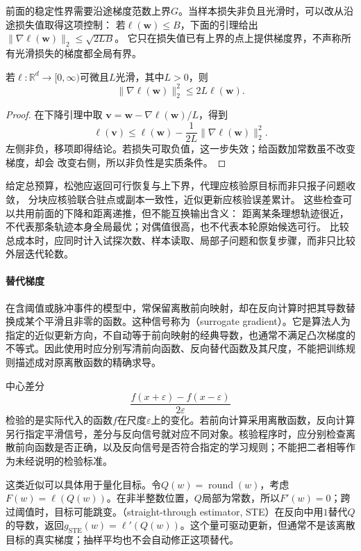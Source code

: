 前面的稳定性界需要沿途梯度范数上界$G$。当样本损失非负且光滑时，可以改从沿途损失值取得这项控制：
若$\ell(\bm w)\leq B$，下面的引理给出$\|\nabla\ell(\bm w)\|_2\leq\sqrt{2LB}$。
它只在损失值已有上界的点上提供梯度界，不声称所有光滑损失的梯度都全局有界。

\begin{lemma}[非负光滑函数的梯度自界]
\label{lem:opt-self-bounding}
若$\ell:\mathbb{R}^d\to[0,\infty)$可微且$L$光滑，其中$L>0$，则
\[
  \lVert\nabla\ell(\bm{w})\rVert_2^2\leq2L\ell(\bm{w}).
\]
\end{lemma}

\begin{proof}
在下降引理中取
$\bm{v}=\bm{w}-\nabla\ell(\bm{w})/L$，得到
\[
  \ell(\bm{v})
  \leq\ell(\bm{w})-\frac{1}{2L}
  \lVert\nabla\ell(\bm{w})\rVert_2^2.
\]
左侧非负，移项即得结论。若损失可取负值，这一步失效；给函数加常数虽不改变梯度，却会
改变右侧，所以非负性是实质条件。
\end{proof}

给定总预算，松弛应返回可行恢复与上下界，代理应核验原目标而非只报子问题收敛，
分块应核验联合驻点或副本一致性，近似更新应核验误差累计。
这些检查可以共用前面的下降和距离递推，但不能互换输出含义：
距离某条理想轨迹很近，不代表那条轨迹本身全局最优；对偶值很高，也不代表本轮原始候选可行。
比较总成本时，应同时计入试探次数、样本读取、局部子问题和恢复步骤，而非只比较外层迭代轮数。

\paragraph{替代梯度}
\label{sec:opt-straight-through}

在含阈值或脉冲事件的模型中，常保留离散前向映射，却在反向计算时把其导数替换成某个平滑且非零的函数。这种信号称为（surrogate gradient）。它是算法人为指定的近似更新方向，不自动等于前向映射的经典导数，也通常不满足凸次梯度的不等式。因此使用时应分别写清前向函数、反向替代函数及其尺度，不能把训练规则描述成对原离散函数的精确求导。

中心差分
\[   \frac{f(x+\varepsilon)-f(x-\varepsilon)}{2\varepsilon} \]
检验的是实际代入的函数$f$在尺度$\varepsilon$上的变化。若前向计算采用离散函数，反向计算另行指定平滑信号，差分与反向信号就对应不同对象。核验程序时，应分别检查离散前向函数是否正确，以及反向信号是否符合指定的学习规则；不能把二者相等作为未经说明的检验标准。


这类近似可以具体用于量化目标。令$Q(w)=\operatorname{round}(w)$，考虑$F(w)=\ell(Q(w))$。在非半整数位置，$Q$局部为常数，所以$F'(w)=0$；跨过阈值时，目标可能跳变。（straight-through estimator, STE）在反向中用$1$替代$Q$的导数，返回$g_{\mathrm{STE}}(w)=\ell'(Q(w))$。这个量可驱动更新，但通常不是该离散目标的真实梯度；抽样平均也不会自动修正这项替代。


